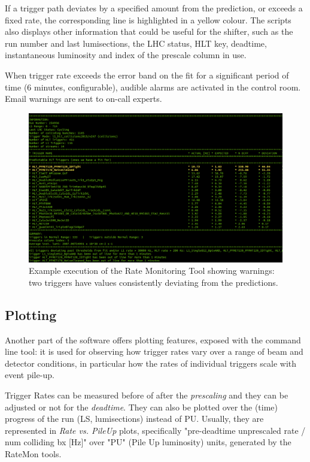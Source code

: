If a trigger path deviates by a specified amount from the prediction, or exceeds a fixed rate, the corresponding line is highlighted in a yellow colour. The scripts also displays other information that could be useful for the shifter, such as the run number and last lumisections, the LHC status, HLT key, deadtime, instantaneous luminosity and index of the prescale column in use.

When trigger rate exceeds the error band on the fit for a significant period of time (6 minutes, configurable), audible alarms are activated in the control room. Email warnings are sent to on-call experts.

\begin{figure}
    \centerline{
        \includegraphics[width=0.8\paperwidth]{figures/ratemon_warnings}}
    \caption{Example execution of the Rate Monitoring Tool showing warnings: two triggers have values consistently deviating from the predictions. \cite{ratemon-twiki}}
    \label{fig:ratemon_warnings}
\end{figure}

\subsection{Plotting}

Another part of the software offers plotting features, exposed with the  command line tool: it is used for observing how trigger rates vary over a range of beam and detector conditions, in particular how the rates of individual triggers scale with event pile-up.

Trigger Rates can be measured before of after the \textit{prescaling} and they can be adjusted or not for the \textit{deadtime}. They can also be plotted over the (time) progress of the run (LS, lumisections) instead of PU. Usually, they are represented in \textit{Rate vs. PileUp} plots, specifically "pre-deadtime unprescaled rate / num colliding bx [Hz]" over "PU" (Pile Up luminosity) units, generated by the RateMon tools.

